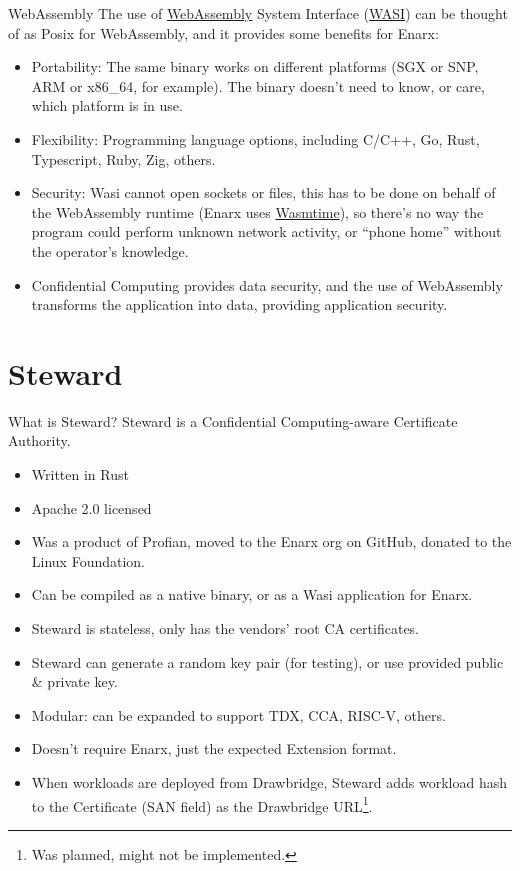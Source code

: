 \documentclass[graphics,compress]{beamer}
\begin{document}
\begin{frame}{WebAssembly}
    The use of \href{https://webassembly.org}{WebAssembly} System Interface (\href{https://wasi.dev}{WASI}) can be thought of as Posix for WebAssembly, and it provides some benefits for Enarx:
    \begin{itemize}
        \item Portability: The same binary works on different platforms (SGX or SNP, ARM or x86\_64, for example). The binary doesn't need to know, or care, which platform is in use.
        \item Flexibility: Programming language options, including C/C++, Go, Rust, Typescript, Ruby, Zig, others.
        \item Security: Wasi cannot open sockets or files, this has to be done on behalf of the WebAssembly runtime (Enarx uses \href{https://wasmtime.dev}{Wasmtime}), so there's no way the program could perform unknown network activity, or ``phone home'' without the operator's knowledge.
        \item Confidential Computing provides data security, and the use of WebAssembly transforms the application into data, providing application security.
    \end{itemize}
\end{frame}

\section{Steward}
\begin{frame}{What is Steward?}
Steward is a Confidential Computing-aware Certificate Authority.
\begin{itemize}
    \item Written in Rust
    \item Apache 2.0 licensed
    \item Was a product of Profian, moved to the Enarx org on GitHub, donated to the Linux Foundation.
    \item Can be compiled as a native binary, or as a Wasi application for Enarx.
    \item Steward is stateless, only has the vendors' root CA certificates.
    \item Steward can generate a random key pair (for testing), or use provided public \& private key.
    \item Modular: can be expanded to support TDX, CCA, RISC-V, others.
    \item Doesn't require Enarx, just the expected Extension format.
    \item When workloads are deployed from Drawbridge, Steward adds workload hash to the Certificate (SAN field) as the Drawbridge URL\footnote{Was planned, might not be implemented.}.
\end{itemize}
\end{frame}
\end{document}
